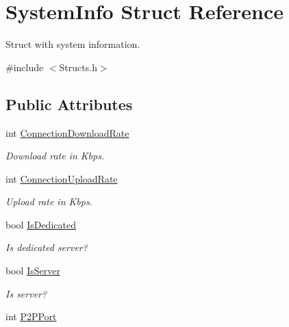 \hypertarget{structSystemInfo}{\section{System\-Info Struct Reference}
\label{structSystemInfo}
}


Struct with system information.  




{\ttfamily \#include $<$Structs.\-h$>$}

\subsection*{Public Attributes}
\begin{DoxyCompactItemize}
\item 
\hypertarget{structSystemInfo_a3d6368c9202c50774197155ff1a6e8e7}{int \hyperlink{structSystemInfo_a3d6368c9202c50774197155ff1a6e8e7}{Connection\-Download\-Rate}}\label{structSystemInfo_a3d6368c9202c50774197155ff1a6e8e7}

\begin{DoxyCompactList}\small\item\em Download rate in Kbps. \end{DoxyCompactList}\item 
\hypertarget{structSystemInfo_a57b905820121dd13c62026a58a5f9b34}{int \hyperlink{structSystemInfo_a57b905820121dd13c62026a58a5f9b34}{Connection\-Upload\-Rate}}\label{structSystemInfo_a57b905820121dd13c62026a58a5f9b34}

\begin{DoxyCompactList}\small\item\em Upload rate in Kbps. \end{DoxyCompactList}\item 
\hypertarget{structSystemInfo_acd6f3cbafcee73181edc08dd3eae1599}{bool \hyperlink{structSystemInfo_acd6f3cbafcee73181edc08dd3eae1599}{Is\-Dedicated}}\label{structSystemInfo_acd6f3cbafcee73181edc08dd3eae1599}

\begin{DoxyCompactList}\small\item\em Is dedicated server? \end{DoxyCompactList}\item 
\hypertarget{structSystemInfo_a13101b94bbf077f73232fa7c374def87}{bool \hyperlink{structSystemInfo_a13101b94bbf077f73232fa7c374def87}{Is\-Server}}\label{structSystemInfo_a13101b94bbf077f73232fa7c374def87}

\begin{DoxyCompactList}\small\item\em Is server? \end{DoxyCompactList}\item 
\hypertarget{structSystemInfo_acc041cb71d46ffbbf1ca0f06285b8f14}{int \hyperlink{structSystemInfo_acc041cb71d46ffbbf1ca0f06285b8f14}{P2\-P\-Port}}\label{structSystemInfo_acc041cb71d46ffbbf1ca0f06285b8f14}


\end{DoxyCompactItemize}
